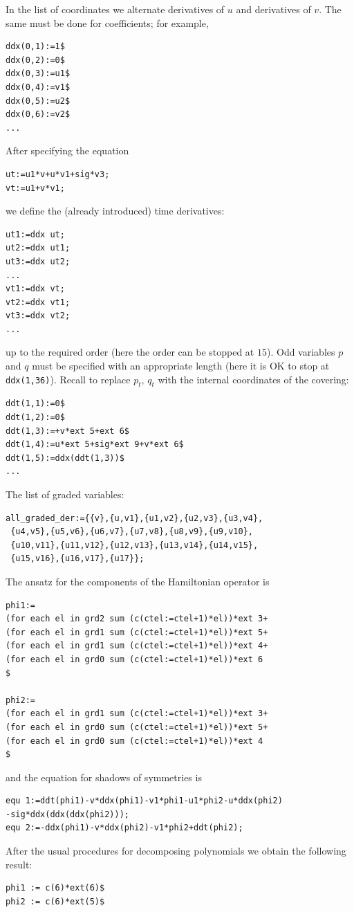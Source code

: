 In the list of coordinates we alternate derivatives of $u$ and derivatives of
$v$. The same must be done for coefficients; for example,
\begin{verbatim}
ddx(0,1):=1$
ddx(0,2):=0$
ddx(0,3):=u1$
ddx(0,4):=v1$
ddx(0,5):=u2$
ddx(0,6):=v2$
...
\end{verbatim}
After specifying the equation
\begin{verbatim}
ut:=u1*v+u*v1+sig*v3;
vt:=u1+v*v1;
\end{verbatim}
we define the (already introduced) time derivatives:
\begin{verbatim}
ut1:=ddx ut;
ut2:=ddx ut1;
ut3:=ddx ut2;
...
vt1:=ddx vt;
vt2:=ddx vt1;
vt3:=ddx vt2;
...
\end{verbatim}
up to the required order (here the order can be stopped at $15$).  Odd
variables $p$ and $q$ must be specified with an appropriate length (here it is
OK to stop at \texttt{ddx(1,36)}). Recall to replace $p_t$, $q_t$ with the
internal coordinates of the covering:
\begin{verbatim}
ddt(1,1):=0$
ddt(1,2):=0$
ddt(1,3):=+v*ext 5+ext 6$
ddt(1,4):=u*ext 5+sig*ext 9+v*ext 6$
ddt(1,5):=ddx(ddt(1,3))$
...
\end{verbatim}
The list of graded variables:
\begin{verbatim}
all_graded_der:={{v},{u,v1},{u1,v2},{u2,v3},{u3,v4},
 {u4,v5},{u5,v6},{u6,v7},{u7,v8},{u8,v9},{u9,v10},
 {u10,v11},{u11,v12},{u12,v13},{u13,v14},{u14,v15},
 {u15,v16},{u16,v17},{u17}};
\end{verbatim}
The ansatz for the components of the Hamiltonian operator is
\begin{verbatim}
phi1:=
(for each el in grd2 sum (c(ctel:=ctel+1)*el))*ext 3+
(for each el in grd1 sum (c(ctel:=ctel+1)*el))*ext 5+
(for each el in grd1 sum (c(ctel:=ctel+1)*el))*ext 4+
(for each el in grd0 sum (c(ctel:=ctel+1)*el))*ext 6
$

phi2:=
(for each el in grd1 sum (c(ctel:=ctel+1)*el))*ext 3+
(for each el in grd0 sum (c(ctel:=ctel+1)*el))*ext 5+
(for each el in grd0 sum (c(ctel:=ctel+1)*el))*ext 4
$
\end{verbatim}
and the equation for shadows of symmetries is
\begin{verbatim}
equ 1:=ddt(phi1)-v*ddx(phi1)-v1*phi1-u1*phi2-u*ddx(phi2)
-sig*ddx(ddx(ddx(phi2)));
equ 2:=-ddx(phi1)-v*ddx(phi2)-v1*phi2+ddt(phi2);
\end{verbatim}
After the usual procedures for decomposing polynomials we obtain the following
result:
\begin{verbatim}
phi1 := c(6)*ext(6)$
phi2 := c(6)*ext(5)$
\end{verbatim}
